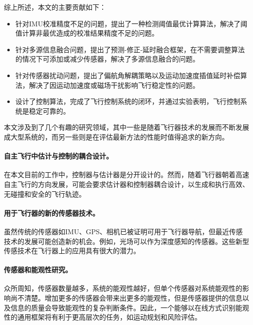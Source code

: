 \documentclass[
  type=master
]{gdutthesis}
\begin{document}
%
综上所述，本文的主要贡献如下：
\begin{itemize}
	\item 针对IMU校准精度不足的问题，提出了一种检测阈值最优计算算法，解决了阈值计算非最优造成的校准结果精度不足的问题。
	\item 针对多源信息融合问题，提出了预测-修正-延时融合框架，在不需要调整算法的情况下可添加或减少传感器，解决了多源信息融合的问题。
	\item 针对传感器扰动问题，提出了偏航角解耦策略以及运动加速度插值延时补偿算法，解决了因运动加速度或磁场干扰影响飞行稳定性的问题。
	\item 设计了控制算法，完成了飞行控制系统的闭环，并通过实验表明，飞行控制系统是稳定可靠的。
\end{itemize}

本文涉及到了几个有趣的研究领域，其中一些是随着飞行器技术的发展而不断发展成大型系统的，而另一些则是在评估最新方法的性能时值得追求的新方向。
\paragraph{自主飞行中估计与控制的耦合设计。}
在本文目前的工作中，控制器与估计器是分开设计的。然而，随着飞行器朝着高速自主飞行的方向发展，可能会要求估计器和控制器耦合设计，以生成和执行高效、无碰撞和安全的飞行轨迹。
\paragraph{用于飞行器的新的传感器技术。}
虽然传统的传感器如IMU、GPS、相机已被证明可用于飞行器导航，但最近传感技术的发展可能创造新的机会。例如，光场可以作为深度感知的传感器。这些新型传感技术在飞行器上的应用具有很大的潜力。
\paragraph{传感器和能观性研究。}
众所周知，传感器数量越多，系统的能观性越好，但单个传感器对系统能观性的影响尚不清楚。增加更多的传感器会带来出更多的能观性，但是传感器提供的信息以及信息的质量会导致能观性的复杂判断条件。因此，一个能够以在线方式识别能观性的通用框架将有利于更高层次的任务，如运动规划和风险评估。
\end{document}
